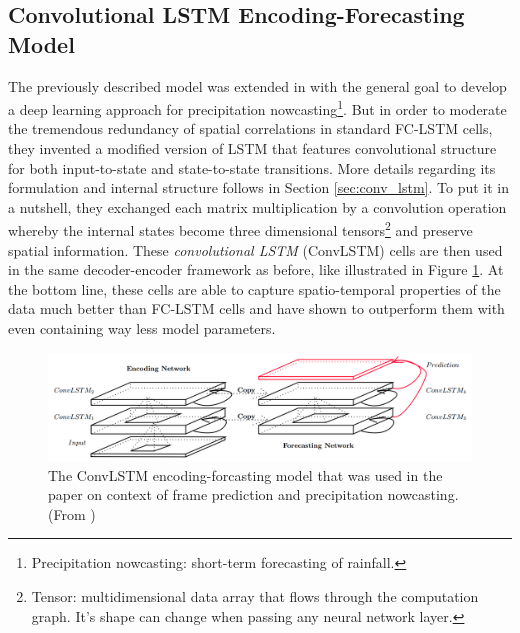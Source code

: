 \subsection{Convolutional LSTM Encoding-Forecasting Model}

The previously described model was extended in \parencite{conv_lstm_nowcasting} with the general goal to develop a deep learning approach for precipitation nowcasting\footnote{Precipitation nowcasting: short-term forecasting of rainfall.}. But in order to moderate the tremendous redundancy of spatial correlations in standard FC-LSTM cells, they invented a modified version of LSTM that features convolutional structure for both input-to-state and state-to-state transitions. More details regarding its formulation and internal structure follows in Section \ref{sec:conv_lstm}. To put it in a nutshell, they exchanged each matrix multiplication by a convolution operation whereby the internal states become three dimensional tensors\footnote{Tensor: multidimensional data array that flows through the computation graph. It's shape can change when passing any neural network layer.} and preserve spatial information. These \textit{convolutional LSTM} (ConvLSTM) cells are then used in the same decoder-encoder framework as before, like illustrated in Figure \ref{fig:convlstm_model}. At the bottom line, these cells are able to capture spatio-temporal properties of the data much better than FC-LSTM cells and have shown to outperform them with even containing way less model parameters.

\begin{figure}[htb]
	\centering
	\includegraphics[width=0.8\linewidth]{figures/related/nowcasting_model.png} 
	\caption[ConvLSTM Encoding-Forecasting Model]{The ConvLSTM encoding-forcasting model that was used in the paper on context of frame prediction and precipitation nowcasting. (From \parencite{conv_lstm_nowcasting})} \label{fig:convlstm_model}
\end{figure}

